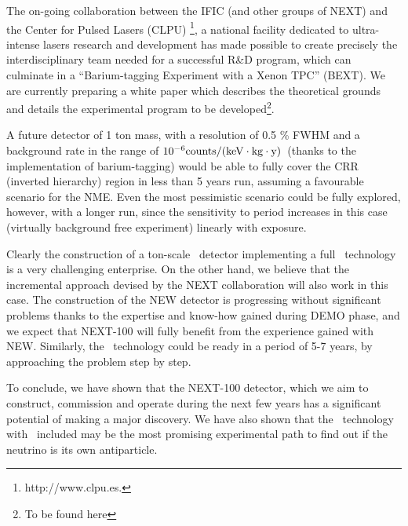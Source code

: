 The on-going collaboration between the IFIC (and other groups of NEXT) and the Center for Pulsed Lasers (CLPU) \footnote{http://www.clpu.es.}, a national facility dedicated to ultra-intense lasers research and development has made possible to create precisely the interdisciplinary team needed for a successful R\&D program, which can culminate in a ``Barium-tagging Experiment with a Xenon TPC'' (BEXT). We are currently preparing a white paper which describes the theoretical grounds and details the experimental program to be developed\footnote{To be found here}. 

A future detector of 1 ton mass, with a resolution of 0.5 \% FWHM and a background rate in the range of $10^{-6} \rm counts/(keV \cdot kg \cdot y)$~(thanks to the implementation of barium-tagging) would be able to fully cover the CRR (inverted hierarchy) region in less than 5 years run, assuming a favourable scenario for the NME. Even the most pessimistic scenario could be fully explored, however, with a longer run, since the sensitivity to period increases in this case (virtually background free experiment) linearly with exposure. 

Clearly the construction of a ton-scale \HPXE\ detector implementing a full \BATA\ technology is a very challenging enterprise. On the other hand, we believe that the incremental approach devised by the NEXT collaboration will also work in this case. The construction of the NEW detector is progressing without significant problems thanks to the expertise and know-how gained during DEMO phase, and we expect that NEXT-100 will fully benefit from the experience gained with NEW. Similarly, the \BATA\ technology could be ready in a period of 5-7 years, by approaching the problem step by step. 

To conclude, we have shown that the NEXT-100 detector, which we aim to construct, commission and operate during the next few years has a significant potential of making a major discovery. We have also shown that the \HPXE\ technology with \BATA\ included may be the most promising experimental path to find out if the neutrino is its own antiparticle. 
 